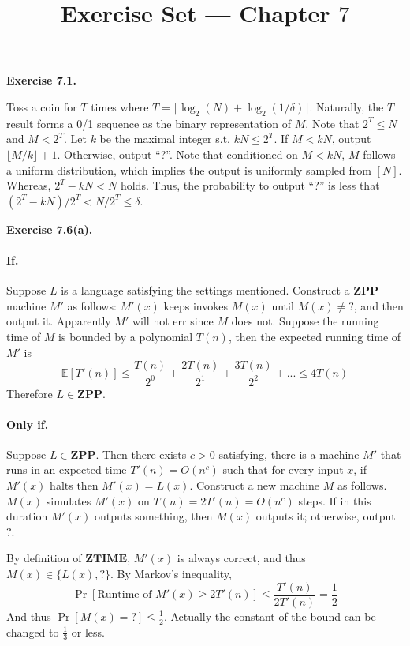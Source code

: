 \documentclass[a4paper]{article}
\title{Exercise Set --- Chapter $7$}
\date{}
\newenvironment{exercise}[1]{
	\par
	\noindent\textbf{Exercise #1.}\quad
}{
	\par
	\bigskip
}
\begin{document}
    \maketitle

    \begin{exercise}{7.1}
        Toss a coin for $T$ times where $T = \lceil\log_2(N) + \log_2(1/\delta)\rceil$. Naturally, the $T$ result forms a 0/1 sequence as the binary representation of $M$. Note that $2^T \leq N$ and $M < 2^T$. Let $k$ be the maximal integer s.t. $kN \leq 2^T$. If $M < kN$, output $\lfloor M/k\rfloor + 1$. Otherwise, output ``?''. Note that conditioned on $M < kN$, $M$ follows a uniform distribution, which implies the output is uniformly sampled from $[N]$. Whereas, $2^T - kN < N$ holds. Thus, the probability to output ``?'' is less that $(2^T - kN)/2^T < N/2^T \leq \delta$.
    \end{exercise}

    \begin{exercise}{7.6(a)}
		
		\paragraph{If.} Suppose $L$ is a language satisfying the settings mentioned. Construct a $\mathbf{ZPP}$ machine $M'$ as follows: $M'(x)$ keeps invokes $M(x)$ until $M(x)\neq ?$, and then output it. Apparently $M'$ will not err since $M$ does not. Suppose the running time of $M$ is bounded by a polynomial $T(n)$, then the expected running time of $M'$ is
		$$\mathbb{E}[T'(n)]\leq\frac{T(n)}{2^0}+\frac{2T(n)}{2^1}+\frac{3T(n)}{2^2}+...\leq 4T(n)$$
		Therefore $L\in\mathbf{ZPP}$.
		
		\paragraph{Only if.} Suppose $L\in\mathbf{ZPP}$. Then there exists $c>0$ satisfying, there is a machine $M'$ that runs in an expected-time $T'(n)=O(n^c)$ such that for every input $x$, if $M'(x)$ halts then $M'(x)=L(x)$. Construct a new machine $M$ as follows. $M(x)$ simulates $M'(x)$ on $T(n)=2T'(n)=O(n^c)$ steps. If in this duration $M'(x)$ outputs something, then $M(x)$ outputs it; otherwise, output $?$.
		
		By definition of $\mathbf{ZTIME}$, $M'(x)$ is always correct, and thus $M(x)\in\{L(x),?\}$. By Markov's inequality, 
		$$\Pr[\text{Runtime of }M'(x)\geq 2T'(n)]\leq\frac{T'(n)}{2T'(n)}=\frac{1}{2}$$
		And thus $\Pr[M(x)=?]\leq\frac{1}{2}$. Actually the constant of the bound can be changed to $\frac{1}{3}$ or less. 
    \end{exercise}
\end{document}
